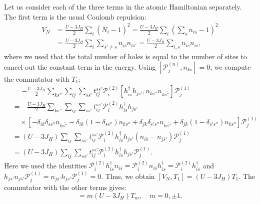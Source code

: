 \documentclass[11pt, a4paper]{article}
\begin{document}
Let us consider each of the three terms in the atomic Hamiltonian separately. The first term is the usual Coulomb repulsion:
\begin{align}
V_N &= \frac{U-3J_H}{2} \sum_i (\overline{N}_i-1)^2 = \frac{U-3J_H}{2} \sum_i \left(\sum_s n_{is} - 1\right)^2 \nonumber \\
&= \frac{U-3J_H}{2} \sum_i \sum_{s' \neq s} n_{is} n_{is'} = \frac{U-3J_H}{2} \sum_{i, s} n_{is} n_{i\overline{s}}, \label{eq:A4}
\end{align}
where we used that the total number of holes is equal to the number of sites to cancel out the constant term in the energy. Using $[\mathcal{P}_j^{(n)}, n_{ks}] = 0$, we compute the commutator with $T_1$:
\begin{align}
[T_1, V_N] &= -\frac{U-3J_H}{2} \sum_{ks''} \sum_{ij} \sum_{ss'} t_{ij}^{ss'} \mathcal{P}_i^{(2)} [h_{is}^{\dagger} h_{js'}, n_{ks''} n_{k\overline{s''}}] \mathcal{P}_j^{(1)} \nonumber \\
&= -\frac{U-3J_H}{2} \sum_{ks''} \sum_{ij} \sum_{ss'} t_{ij}^{ss'} \mathcal{P}_i^{(2)} h_{is}^{\dagger} h_{js'} \nonumber \\
&\quad \times [-\delta_{ik}\delta_{ss''} n_{k\overline{s''}} - \delta_{ik}(1-\delta_{ss''}) n_{ks''} + \delta_{jk}\delta_{s's''} n_{k\overline{s''}} + \delta_{jk}(1-\delta_{s's''}) n_{ks''}] \mathcal{P}_j^{(1)} \nonumber \\
&= (U-3J_H) \sum_{ij} \sum_{ss'} t_{ij}^{ss'} \mathcal{P}_i^{(2)} h_{is}^{\dagger} h_{js'} (n_{i\overline{s}} - n_{j\overline{s}'}) \mathcal{P}_j^{(1)} \nonumber \\
&= (U-3J_H) \sum_{ij} \sum_{ss'} t_{ij}^{ss'} \mathcal{P}_i^{(2)} h_{is}^{\dagger} h_{js'} \mathcal{P}_j^{(1)}. \label{eq:A5}
\end{align}
Here we used the identities $\mathcal{P}_i^{(2)} h_{is}^{\dagger} n_{i\overline{s}} = \mathcal{P}_i^{(2)} n_{i\overline{s}} h_{is}^{\dagger} = \mathcal{P}_i^{(2)} h_{is}^{\dagger}$ and $h_{js'} n_{j\overline{s}'} \mathcal{P}_j^{(1)} = n_{j\overline{s}'} h_{js'} \mathcal{P}_j^{(1)} = 0$. Thus, we obtain $[V_N, T_1] = (U-3J_H) T_1$. The commutator with the other terms gives:
\begin{equation}
[V_N, T_m] = m(U-3J_H) T_m, \quad m = 0, \pm 1. \label{eq:A8}
\end{equation}
\end{document}
